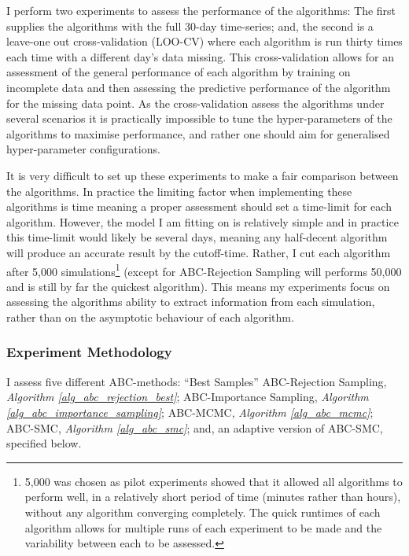 \documentclass[11pt,a4paper]{article}
\theoremstyle{break}
\begin{document}
  \par I perform two experiments to assess the performance of the algorithms: The first supplies the algorithms with the full 30-day time-series; and, the second is a leave-one out cross-validation (LOO-CV) where each algorithm is run thirty times each time with a different day's data missing. This cross-validation allows for an assessment of the general performance of each algorithm by training on incomplete data and then assessing the predictive performance of the algorithm for the missing data point. As the cross-validation assess the algorithms under several scenarios it is practically impossible to tune the hyper-parameters of the algorithms to maximise performance, and rather one should aim for generalised hyper-parameter configurations.

  \par It is very difficult to set up these experiments to make a fair comparison between the algorithms. In practice the limiting factor when implementing these algorithms is time meaning a proper assessment should set a time-limit for each algorithm. However, the model I am fitting on is relatively simple and in practice this time-limit would likely be several days, meaning any half-decent algorithm will produce an accurate result by the cutoff-time. Rather, I cut each algorithm after 5,000 simulations\footnote{5,000 was chosen as pilot experiments showed that it allowed all algorithms to perform well, in a relatively short period of time (minutes rather than hours), without any algorithm converging completely. The quick runtimes of each algorithm allows for multiple runs of each experiment to be made and the variability between each to be assessed.} (except for ABC-Rejection Sampling will performs 50,000 and is still by far the quickest algorithm). This means my experiments focus on assessing the algorithms ability to extract information from each simulation, rather than on the asymptotic behaviour of each algorithm.

\subsubsection*{Experiment Methodology}

  \par I assess five different ABC-methods: ``Best Samples'' ABC-Rejection Sampling, \textit{Algorithm \ref{alg_abc_rejection_best}}; ABC-Importance Sampling, \textit{Algorithm \ref{alg_abc_importance_sampling}}; ABC-MCMC, \textit{Algorithm \ref{alg_abc_mcmc}}; ABC-SMC, \textit{Algorithm \ref{alg_abc_smc}}; and, an adaptive version of ABC-SMC, specified below.
\end{document}
